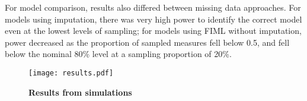 \documentclass[11pt, oneside]{article}   	%
\begin{document}
For model comparison, results also differed between missing data approaches. For models using imputation, there was very high power to identify the correct model even at the lowest levels of sampling; for models using FIML without imputation, power decreased as the proportion of sampled measures fell below 0.5, and fell below the nominal 80\% level at a sampling proportion of 20\%.  

\begin{figure}[!h]
\caption{\textbf{Results from simulations}}
\centering
\texttt{[image: results.pdf]}
\label{fig:results}
\end{figure}


\end{document}
